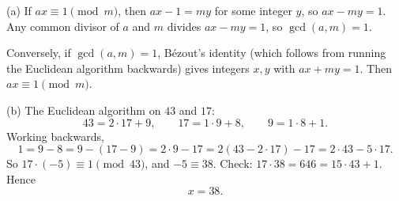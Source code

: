 (a) If $ax\equiv1\pmod m$, then $ax-1=my$ for some integer $y$, so $ax-my=1$. Any common divisor of $a$ and $m$ divides $ax-my=1$, so $\gcd(a,m)=1$.

Conversely, if $\gcd(a,m)=1$, B\'ezout's identity (which follows from running the Euclidean algorithm backwards) gives integers $x,y$ with $ax+my=1$. Then $ax\equiv1\pmod m$.

(b) The Euclidean algorithm on $43$ and $17$:
\[
43=2\cdot17+9,\qquad 17=1\cdot9+8,\qquad 9=1\cdot8+1.
\]
Working backwards,
\[
1=9-8=9-(17-9)=2\cdot9-17=2(43-2\cdot17)-17=2\cdot43-5\cdot17.
\]
So $17\cdot(-5)\equiv1\pmod{43}$, and $-5\equiv38$. Check: $17\cdot38=646=15\cdot43+1$. Hence
\[\boxed{x=38}.\]
